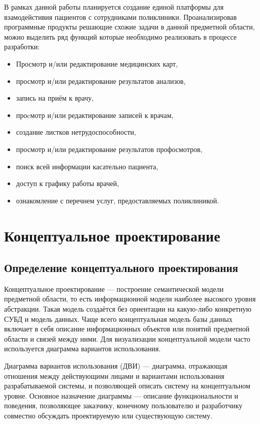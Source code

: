 \documentclass[14pt,a4paper,russian]{extreport}
\begin{document}
В рамках данной работы планируется создание единой платформы для
взамодейстивия пациентов с сотрудниками поликлиники. Проанализировав программные продукты решающие
схожие задачи в данной предметной области, можно выделить ряд функций которые необходимо
реализовать в процессе разработки:
\begin{itemize}[noitemsep]
		
\renewcommand\labelitemi{--}
            \item Просмотр и/или редактирование медицинских карт,
            \item просмотр и/или редактирование результатов анализов,
            \item запись на приём к врачу,
            \item проcмотр и/или редактирование записей к врачам,
            \item создание листков нетрудоспособности,
            \item просмотр и/или редактирование результатов профосмотров,
            \item поиск всей информации касательно пациента,
            \item доступ к графику работы врачей,
            \item ознакомление с перечнем услуг, предоставляемых поликлиникой.
\end{itemize}


\chapter{Концептуальное проектирование}
\section{Определение концептуального проектирования}
Концептуальное проектирование — построение семантической модели предметной
области, то есть информационной модели наиболее высокого уровня абстракции. Такая модель создаётся
без ориентации на какую-либо конкретную СУБД и модель данных.
Чаще всего концептуальная модель базы данных включает в себя описание информационных объектов 
или понятий предметной области и связей между ними. Для визуализации концептуальной
модели часто используется диаграмма вариантов использования.\par
Диаграмма вариантов использования (ДВИ) — диаграмма, отражающая
отношения между действующими лицами и вариантами использования разрабатываемой системы, и
позволяющей описать систему на концептуальном уровне.
Основное назначение диаграммы — описание функциональности и поведения, позволяющее заказчику,
конечному пользователю и разработчику совместно обсуждать проектируемую или существующую
систему.\par
\end{document}
